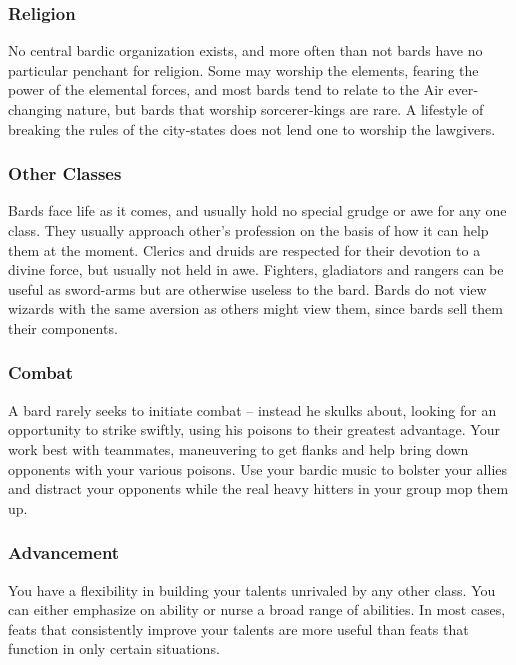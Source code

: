 \subsubsection{Religion}

No central bardic organization exists, and more often than not bards have no particular penchant for religion. Some may worship the elements, fearing the power of the elemental forces, and most bards tend to relate to the Air ever‐changing nature, but bards that worship sorcerer‐kings are rare. A lifestyle of breaking the rules of the city‐states does not lend one to worship the lawgivers.

\subsubsection{Other Classes}

Bards face life as it comes, and usually hold no special grudge or awe for any one class. They usually approach other's profession on the basis of how it can help them at the moment. Clerics and druids are respected for their devotion to a divine force, but usually not held in awe. Fighters, gladiators and rangers can be useful as sword-arms but are otherwise useless to the bard. Bards do not view wizards with the same aversion as others might view them, since bards sell them their components.

\subsubsection{Combat}

A bard rarely seeks to initiate combat -- instead he skulks about, looking for an opportunity to strike swiftly, using his poisons to their greatest advantage. Your work best with teammates, maneuvering to get flanks and help bring down opponents with your various poisons. Use your bardic music to bolster your allies and distract your opponents while the real heavy hitters in your group mop them up.

\subsubsection{Advancement}

You have a flexibility in building your talents unrivaled by any other class. You can either emphasize on ability or nurse a broad range of abilities. In most cases, feats that consistently improve your talents are more useful than feats that function in only certain situations.

